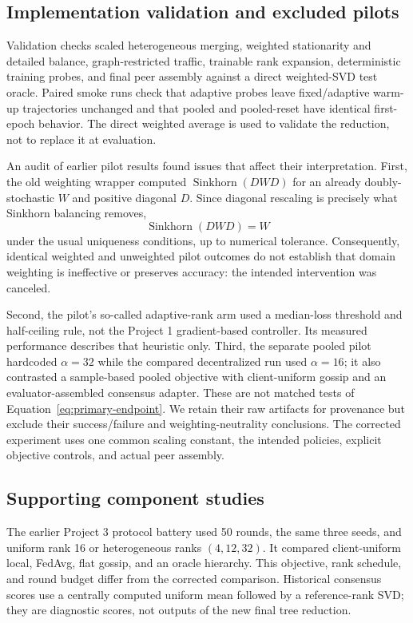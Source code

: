 \documentclass[11pt]{article}
\begin{document}
\subsection{Implementation validation and excluded pilots}
Validation checks scaled heterogeneous merging, weighted stationarity and detailed balance, graph-restricted traffic, trainable rank expansion, deterministic training probes, and final peer assembly against a direct weighted-SVD test oracle. Paired smoke runs check that adaptive probes leave fixed/adaptive warm-up trajectories unchanged and that pooled and pooled-reset have identical first-epoch behavior. The direct weighted average is used to validate the reduction, not to replace it at evaluation.

An audit of earlier pilot results found issues that affect their interpretation. First, the old weighting wrapper computed $\operatorname{Sinkhorn}(DWD)$ for an already doubly-stochastic $W$ and positive diagonal $D$. Since diagonal rescaling is precisely what Sinkhorn balancing removes,
\begin{equation}
 \operatorname{Sinkhorn}(DWD)=W
\end{equation}
under the usual uniqueness conditions, up to numerical tolerance. Consequently, identical weighted and unweighted pilot outcomes do not establish that domain weighting is ineffective or preserves accuracy: the intended intervention was canceled.

Second, the pilot's so-called adaptive-rank arm used a median-loss threshold and half-ceiling rule, not the Project 1 gradient-based controller. Its measured performance describes that heuristic only. Third, the separate pooled pilot hardcoded $\alpha=32$ while the compared decentralized run used $\alpha=16$; it also contrasted a sample-based pooled objective with client-uniform gossip and an evaluator-assembled consensus adapter. These are not matched tests of Equation~\eqref{eq:primary-endpoint}. We retain their raw artifacts for provenance but exclude their success/failure and weighting-neutrality conclusions. The corrected experiment uses one common scaling constant, the intended policies, explicit objective controls, and actual peer assembly.

\subsection{Supporting component studies}
The earlier Project 3 protocol battery used 50 rounds, the same three seeds, and uniform rank 16 or heterogeneous ranks $(4,12,32)$. It compared client-uniform local, FedAvg, flat gossip, and an oracle hierarchy. This objective, rank schedule, and round budget differ from the corrected comparison. Historical consensus scores use a centrally computed uniform mean followed by a reference-rank SVD; they are diagnostic scores, not outputs of the new final tree reduction.
\end{document}
